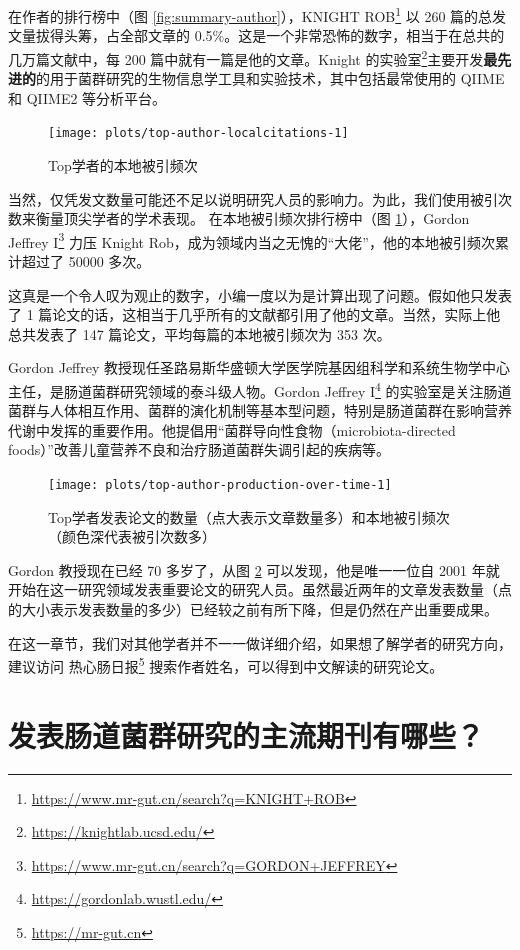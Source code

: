 \documentclass[]{ctexbook}
\renewcommand{\href}[2]{#2\footnote{\url{#1}}}
\begin{document}
在作者的排行榜中（图 \ref{fig:summary-author}），\href{https://www.mr-gut.cn/search?q=KNIGHT+ROB}{KNIGHT ROB} 以 260 篇的总发文量拔得头筹，占全部文章的 0.5\%。这是一个非常恐怖的数字，相当于在总共的几万篇文献中，每 200 篇中就有一篇是他的文章。\href{https://knightlab.ucsd.edu/}{Knight 的实验室}主要开发\textbf{最先进的}的用于菌群研究的生物信息学工具和实验技术，其中包括最常使用的 QIIME 和 QIIME2 等分析平台。

\begin{figure}
\texttt{[image: plots/top-author-localcitations-1]} \caption{Top学者的本地被引频次}\label{fig:top-author-localcitations}
\end{figure}

当然，仅凭发文数量可能还不足以说明研究人员的影响力。为此，我们使用被引次数来衡量顶尖学者的学术表现。
在本地被引频次排行榜中（图 \ref{fig:top-author-localcitations}），\href{https://www.mr-gut.cn/search?q=GORDON+JEFFREY}{Gordon Jeffrey I} 力压 Knight Rob，成为领域内当之无愧的``大佬''，他的本地被引频次累计超过了 50000 多次。

这真是一个令人叹为观止的数字，小编一度以为是计算出现了问题。假如他只发表了 1 篇论文的话，这相当于几乎所有的文献都引用了他的文章。当然，实际上他总共发表了 147 篇论文，平均每篇的本地被引频次为 353 次。

Gordon Jeffrey 教授现任圣路易斯华盛顿大学医学院基因组科学和系统生物学中心主任，是肠道菌群研究领域的泰斗级人物。\href{https://gordonlab.wustl.edu/}{Gordon Jeffrey I} 的实验室是关注肠道菌群与人体相互作用、菌群的演化机制等基本型问题，特别是肠道菌群在影响营养代谢中发挥的重要作用。他提倡用``菌群导向性食物（microbiota-directed foods）''改善儿童营养不良和治疗肠道菌群失调引起的疾病等。

\begin{figure}
\texttt{[image: plots/top-author-production-over-time-1]} \caption{Top学者发表论文的数量（点大表示文章数量多）和本地被引频次（颜色深代表被引次数多）}\label{fig:top-author-production-over-time}
\end{figure}

Gordon 教授现在已经 70 多岁了，从图 \ref{fig:top-author-production-over-time} 可以发现，他是唯一一位自 2001 年就开始在这一研究领域发表重要论文的研究人员。虽然最近两年的文章发表数量（点的大小表示发表数量的多少）已经较之前有所下降，但是仍然在产出重要成果。

在这一章节，我们对其他学者并不一一做详细介绍，如果想了解学者的研究方向，建议访问 \href{https://mr-gut.cn}{热心肠日报} 搜索作者姓名，可以得到中文解读的研究论文。

\hypertarget{ux53d1ux8868ux80a0ux9053ux83ccux7fa4ux7814ux7a76ux7684ux4e3bux6d41ux671fux520aux6709ux54eaux4e9b}{%
\section{发表肠道菌群研究的主流期刊有哪些？}\label{ux53d1ux8868ux80a0ux9053ux83ccux7fa4ux7814ux7a76ux7684ux4e3bux6d41ux671fux520aux6709ux54eaux4e9b}}
\end{document}
